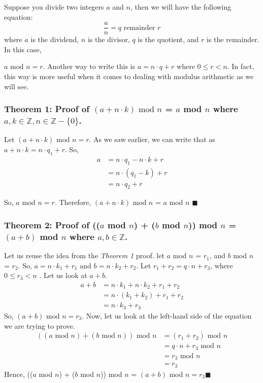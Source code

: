 \documentclass[manuscript,screen,review,nonacm]{acmart}
\begin{document}
Suppose you divide two integers $a$ and $n$, then we will have the following equation:
\[\frac{a}{n} = q \text{ remainder } r\]
where $a$ is the dividend, $n$ is the divisor, $q$ is the quotient, and $r$ is the remainder. 
In this case,  {$a \text{ mod } n = r $. \newline
Another way to write this is \textbf{$a = n\cdot q + r$} where $0 \leq r < n$. In fact, this way is more useful when it comes to dealing with modulus arithmetic as we will see.

\subsubsection*{Theorem 1: Proof of $(a + n\cdot k) \text{ mod }n$ = $a$ mod $n$ where $a,k \in \mathbb{Z}, n \in \mathbb{Z} - \{0\}$.\newline}
Let $(a + n\cdot k) \text{ mod }n = r$. As we saw earlier, we can write that as $a + n\cdot k = n\cdot q_1 + r$. So,
\begin{align*}
a &= n\cdot q_1 - n\cdot k + r  \\
&=  n \cdot (q_1 -k) + r \\
&=  n\cdot q_2 + r
\end{align*}

So, $a \text{ mod } n = r$.
Therefore, $(a + n\cdot k) \text{ mod }n$ = $a$ mod $n$ $\blacksquare$

\subsubsection*{Theorem 2: Proof of (($a$ mod $n$) + ($b$ mod $n$)) mod $n$ = $(a + b)$ mod $n$ where $a,b\in \mathbb{Z}$.\newline}

Let us reuse the idea from the \textit{Theorem 1} proof. let $a$ mod $n$ = $r_1$, and $b$ mod $n$ = $r_2$. 
So, $a = n\cdot k_1 + r_1 \text{ and } b=n\cdot k_2+r_2$.
\newline
Let $r_1 + r_2 = q\cdot n + r_3$, where $0 \leq r_3 <n$
. Let us look at $a+b$.
\begin{align*}
a + b &= n\cdot k_1 + n\cdot k_2 +r_1+r_2  \\
 &= n\cdot (k_1+k_2) + r_1 + r_2 \\
&= n\cdot k_3 + r_3
\end{align*}
So, $(a+b) \text{ mod } n = r_3$. Now, let us look at the left-hand side of the equation we are trying to prove.
\begin{align*}
((a \text{ mod } n) + (b \text{ mod } n)) \text{ mod } n &= (r_1 + r_2)\text{ mod } n \\
& = q\cdot n + r_3 \text{ mod } n \\
 &= r_3 \text{ mod } n \\ 
 &= r_3 
\end{align*}
Hence, (($a$ mod $n$) + ($b$ mod $n$)) mod $n$ = $(a + b)$ mod $n = r_3 \blacksquare\ $ 

}
\end{document}
